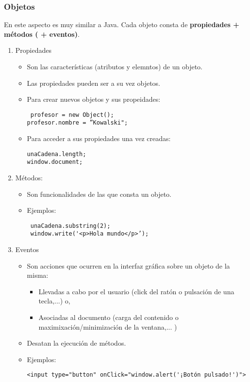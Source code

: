 \documentclass{apuntes}
\begin{document}
\subsubsection{Objetos}
En este aspecto es muy similar a Java. Cada objeto consta de \textbf{ propiedades +  métodos ( + eventos)}. 
\begin{enumerate}
\item Propiedades
\begin{itemize}
\item Son las características (atributos y elemntos) de un objeto. 
\item Las propiedades pueden ser a su vez objetos. 
\item Para crear nuevos objetos y sus propeidades:
\begin{verbatim} 
 profesor = new Object(); 
profesor.nombre = ”Kowalski";
\end{verbatim}
\item Para acceder a sus propiedades una vez creadas:
\begin{verbatim} 
unaCadena.length; 
window.document;
\end{verbatim}
\end{itemize}

\item Métodos: 
\begin{itemize}
\item Son funcionalidades de las que consta un objeto.
\item Ejemplos:
\begin{verbatim} 
 unaCadena.substring(2);
 window.write('<p>Hola mundo</p>’);
\end{verbatim}

\end{itemize}
\item Eventos
\begin{itemize}
\item Son acciones que ocurren  en la interfaz gráfica sobre un objeto de la misma:
\begin{itemize}
\item Llevadas a cabo por el usuario (click del ratón o pulsación de una tecla,...) o,
\item Asociadas al documento (carga del contenido o maximixación/minimización de la ventana,... )
\end{itemize}
\item Desatan la ejecución de métodos.
\item Ejemplos:
\begin{verbatim} 
<input type="button" onClick="window.alert('¡Botón pulsado!')">
\end{verbatim}
\end{itemize}



\end{enumerate}
\end{document}
